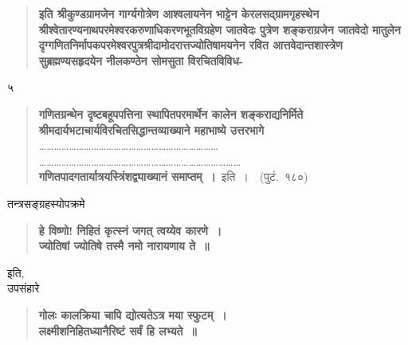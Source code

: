 \documentclass[11pt, openany]{book}
\begin{document}
\begin{quote}
\textbf{इति श्रीकुण्डग्रामजेन गार्ग्यगोत्रेण आश्वलायनेन भाट्टेन केरलसद्ग्रामगृहस्थेन श्रीश्वेतारण्यनाथपरमेश्वरकरुणाधिकरणभूतविग्रहेण जातवेदः पुत्रेण शङ्कराग्रजेन जातवेदो मातुलेन दृग्गणितनिर्मापकपरमेश्वरपुत्रश्रीदामोदरात्तज्योतिषामयनेन रवित आत्तवेदान्तशास्त्रेण सुब्रह्मण्यसहृदयेन नीलकण्ठेन सोमसुता विरचितविविध-}
\end{quote}

\newpage

\begin{center}
५
\end{center}
\thispagestyle{empty}
\begin{quote} 
\textbf{गणितग्रन्थेन दृष्टबहूपपत्तिना स्थापितपरमार्थेन कालेन शङ्कराद्यनिर्मिते श्रीमदार्यभटाचार्यविरचितसिद्धान्तव्याख्याने महाभाष्ये उत्तरभागे} \ldots \ldots \ldots \ldots  \ldots \ldots  \ldots \ldots  \ldots \ldots  \ldots \ldots  \ldots \ldots \ldots \ldots  \ldots \ldots  \ldots \ldots  \ldots \ldots  \ldots \ldots \\
 \ldots \ldots \ldots \ldots  \ldots \ldots  \ldots \ldots  \ldots \ldots  \ldots \ldots  \ldots \ldots \ldots \ldots  \ldots \ldots  \ldots \ldots  \ldots \ldots  \ldots \ldots  \ldots  \ldots \ldots \\ 
\textbf{गणितपादगतार्यात्रयस्त्रिंशद्व्याख्यानं समाप्तम्~।}~इति~।~~(पुटं.~१८०)
\end{quote} 

तन्त्रसङ्ग्रहस्योपक्रमे\textendash 

\begin{quote}
\textbf{हे विष्णो! निहितं कृत्स्नं जगत् त्वय्येव कारणे~।\\
ज्योतिषां ज्योतिषे तस्मै नमो नारायणाय ते~॥}
\end{quote}

\noindent इति, \\

उपसंहारे\textendash 

\begin{quote}
\textbf{गोलः कालक्रिया चापि द्योत्यतेऽत्र मया स्फुटम्~।\\
लक्ष्मीशनिहितध्यानैरिष्टं सर्वं हि लभ्यते~॥}
\end{quote}
\end{document}
